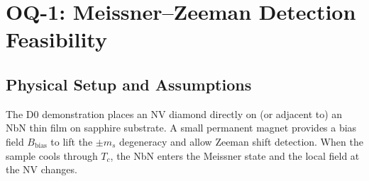 %
%

\section{OQ-1: Meissner--Zeeman Detection Feasibility}
\label{sec:oq1}

\subsection{Physical Setup and Assumptions}
\label{sec:oq1_setup}

The D0 demonstration places an NV diamond directly on (or adjacent to)
an NbN thin film on sapphire substrate.
A small permanent magnet provides a bias field $B_\text{bias}$ to lift the
$\pm m_s$ degeneracy and allow Zeeman shift detection.
When the sample cools through $T_c$, the NbN enters the Meissner state and
the local field at the NV changes.

